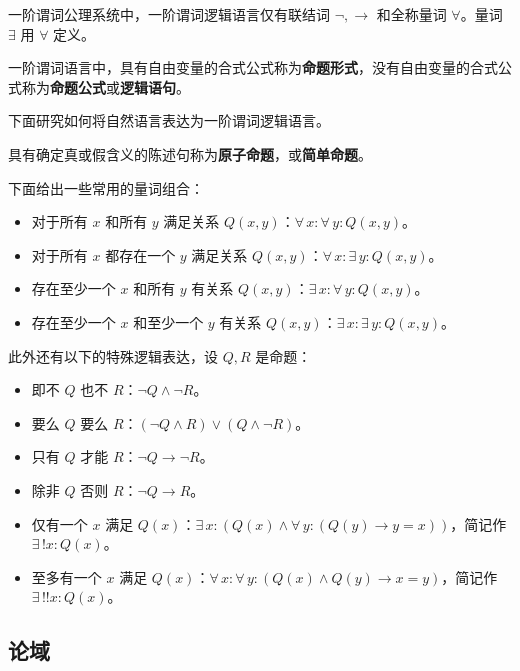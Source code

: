 一阶谓词公理系统中，一阶谓词逻辑语言仅有联结词 $\lnot, \to$ 和全称量词 $\forall$。量词 $\exists$ 用 $\forall$ 定义。

\begin{definition}
    一阶谓词语言中，具有自由变量的合式公式称为\textbf{命题形式}，没有自由变量的合式公式称为\textbf{命题公式}或\textbf{逻辑语句}。
\end{definition}

下面研究如何将自然语言表达为一阶谓词逻辑语言。

\begin{definition}
    具有确定真或假含义的陈述句称为\textbf{原子命题}，或\textbf{简单命题}。
\end{definition}

下面给出一些常用的量词组合：

\begin{itemize}
    \item 对于所有 $x$ 和所有 $y$ 满足关系 $Q(x, y)$：$\forall\,x: \forall\,y: Q(x, y)$。
    \item 对于所有 $x$ 都存在一个 $y$ 满足关系 $Q(x, y)$：$\forall\,x: \exists\,y: Q(x, y)$。
    \item 存在至少一个 $x$ 和所有 $y$ 有关系 $Q(x, y)$：$\exists\,x: \forall\,y: Q(x, y)$。
    \item 存在至少一个 $x$ 和至少一个 $y$ 有关系 $Q(x, y)$：$\exists\,x: \exists\,y: Q(x, y)$。
\end{itemize}

此外还有以下的特殊逻辑表达，设 $Q, R$ 是命题：

\begin{itemize}
    \item 即不 $Q$ 也不 $R$：$\lnot Q \land \lnot R$。
    \item 要么 $Q$ 要么 $R$：$(\lnot Q \land R) \lor (Q \land \lnot R)$。
    \item 只有 $Q$ 才能 $R$：$\lnot Q \to \lnot R$。
    \item 除非 $Q$ 否则 $R$：$\lnot Q \to R$。
    \item 仅有一个 $x$ 满足 $Q(x)$：$\exists\,x: (Q(x) \land \forall\,y: (Q(y) \to y = x))$，简记作 $\exists\,!x: Q(x)$。
    \item 至多有一个 $x$ 满足 $Q(x)$：$\forall\,x: \forall\,y: (Q(x) \land Q(y) \to x = y)$，简记作 $\exists\,!!x: Q(x)$。
\end{itemize}

\subsection{论域}

